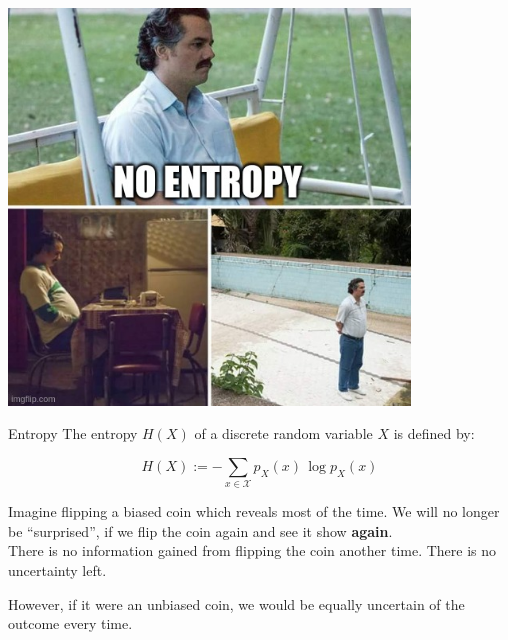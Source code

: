 \begin{frame}{\subsecname}
{\begin{minipage}{.99\textwidth}
\begin{minipage}{0.3\textwidth}
\begin{center}
	\end{center}
\end{minipage}
\hfill
\begin{minipage}{0.3\textwidth}
	\begin{center}
		\includegraphics[width=0.8\textwidth]{img/meme_entropy_none}
	\end{center}
	\end{minipage}
\end{minipage}
}

\end{frame}

\begin{frame}

\begin{block}{Entropy} 
The entropy $H(X)$ of a discrete random variable $X$ is defined by:

\begin{equation}
\label{eq:entropy}
H(X) := - \sum_{x \in \mathcal X} p_X(x)\,\log p_X(x)
\end{equation}

\end{block}

Imagine flipping a biased coin which reveals  most of the time. 
We will no longer be ``surprised'', if we flip the coin again and see it show  \textbf{again}.\\

There is no information gained from flipping the coin another time. There is no uncertainty left.

However, if it were an unbiased coin, we would be equally uncertain of the outcome every time.

\end{frame}

